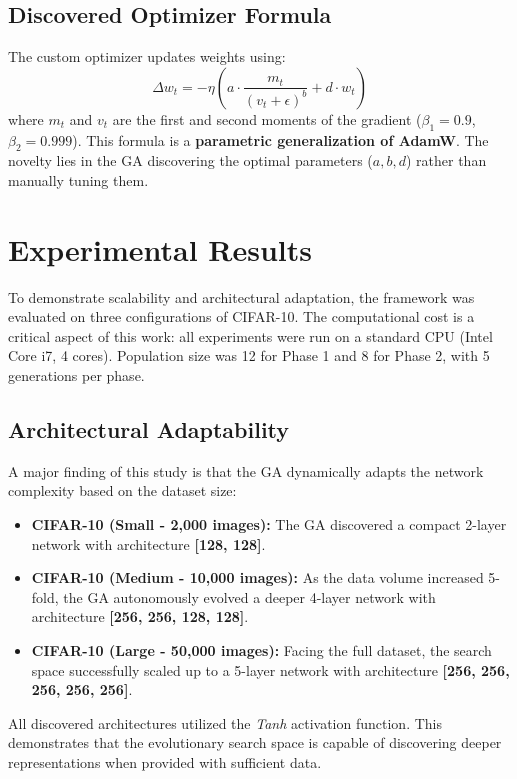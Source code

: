 \documentclass[sn-mathphys]{sn-jnl}%
\begin{document}
\subsection{Discovered Optimizer Formula}
The custom optimizer updates weights using:
\begin{equation}
\Delta w_t = - \eta \left( a \cdot \frac{m_t}{(v_t + \epsilon)^b} + d \cdot w_t \right)
\end{equation}
where \(m_t\) and \(v_t\) are the first and second moments of the gradient (\(\beta_1 = 0.9\), \(\beta_2 = 0.999\)). This formula is a \textbf{parametric generalization of AdamW}. The novelty lies in the GA discovering the optimal parameters (\(a, b, d\)) rather than manually tuning them.

\section{Experimental Results}\label{sec3}
To demonstrate scalability and architectural adaptation, the framework was evaluated on three configurations of CIFAR-10. The computational cost is a critical aspect of this work: all experiments were run on a standard CPU (Intel Core i7, 4 cores). Population size was 12 for Phase 1 and 8 for Phase 2, with 5 generations per phase.

\subsection{Architectural Adaptability}
A major finding of this study is that the GA dynamically adapts the network complexity based on the dataset size:
\begin{itemize}
    \item \textbf{CIFAR-10 (Small - 2,000 images):} The GA discovered a compact 2-layer network with architecture \textbf{[128, 128]}.
    \item \textbf{CIFAR-10 (Medium - 10,000 images):} As the data volume increased 5-fold, the GA autonomously evolved a deeper 4-layer network with architecture \textbf{[256, 256, 128, 128]}.
    \item \textbf{CIFAR-10 (Large - 50,000 images):} Facing the full dataset, the search space successfully scaled up to a 5-layer network with architecture \textbf{[256, 256, 256, 256, 256]}.
\end{itemize}
All discovered architectures utilized the \textit{Tanh} activation function. This demonstrates that the evolutionary search space is capable of discovering deeper representations when provided with sufficient data.
\end{document}
